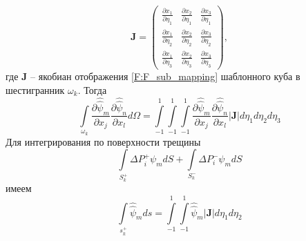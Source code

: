 \begin{equation}
\mathbf{J}=
\left(
\begin{array}{ccc}
\frac{\partial x_1}{\partial \eta_1} & \frac{\partial x_2}{\partial \eta_1} & \frac{\partial x_3}{\partial \eta_1}\\
\frac{\partial x_1}{\partial \eta_2} & \frac{\partial x_2}{\partial \eta_2} & \frac{\partial x_3}{\partial \eta_2}\\
\frac{\partial x_1}{\partial \eta_3} & \frac{\partial x_2}{\partial \eta_3} & \frac{\partial x_3}{\partial \eta_3}
\end{array}
\right),
\label{F:F_sub_dif2}
\end{equation}
где $\mathbf{J}$ -- якобиан отображения \eqref{F:F_sub_mapping} шаблонного куба в шестигранник $\omega_k$.
Тогда 
\begin{equation}
\int\limits_{\omega_k}\frac{\partial\hat{\hat{\psi}}_{m}}{\partial x_j}\frac{\partial\hat{\hat{\psi}}_{n}}{\partial x_{l}}d\Omega
=\int\limits_{-1}^{1}\int\limits_{-1}^{1}\int\limits_{-1}^{1}
\frac{\partial\hat{\hat{\psi}}_{m}}{\partial x_j}
\frac{\partial\hat{\hat{\psi}}_{n}}{\partial x_{l}}\left| \mathbf{J} \right|d\eta_1d\eta_2d\eta_3
\label{F:F_sub_int2}
\end{equation}
Для интегрирования по поверхности трещины
\begin{equation}
\int\limits_{S_{k}^+}\Delta P_{i}^+\psi_{m} dS+
\int\limits_{S_{k}^-}\Delta P_{i}^-\psi_{m} dS
\label{F:F_sub_int3}
\end{equation}
имеем
\begin{equation}
\int\limits_{s_k^+}\hat{\hat{\psi}}_{m}ds
=\int\limits_{-1}^{1}\int\limits_{-1}^{1}
\hat{\hat{\psi}}_{m}\left| \mathbf{J} \right|d\eta_1d\eta_2
\label{F:F_sub_int4}
\end{equation}


